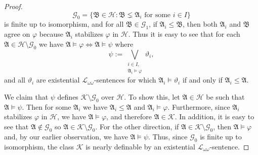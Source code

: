 \documentclass{ndjflart}
\theoremstyle{plain}
\theoremstyle{definition}
\numberwithin{equation}{section}
\begin{document}
\begin{proof}
\[
	\mathcal{G}_0 = \{\mathfrak{B}\in\mathcal{H} \colon
	\mathfrak{B} \lneq \mathfrak{A}_i \text{ for some } i \in I \}
\]
is finite up to isomorphism,
and for all $\mathfrak{B} \in \mathcal{G}_1$,
if $\mathfrak{A}_i\leq\mathfrak{B}$, then both $\mathfrak{A}_i$ and
$\mathfrak{B}$ agree on $\varphi$ because $\mathfrak{A}_i$ stabilizes
$\varphi$ in $\mathcal{H}$.
Thus it is easy to see that for each
$\mathfrak{A}\in\mathcal{H} \setminus \mathcal{G}_0$ we have
$\mathfrak{A} \vDash \varphi \Leftrightarrow \mathfrak{A} \vDash \psi$ where
\[
\psi := \bigvee_{\substack{i\in I,\\\mathfrak{A}_i\vDash\varphi}}\vartheta_i,
\]
and all $\vartheta_i$ are existential $\mathcal{L}_{\omega \omega}$-sentences
for which $\mathfrak{A}_i \vDash \vartheta_i$ if and only if
$\mathfrak{A}_i \leq \mathfrak{A}$.

We claim that $\psi$ defines $\mathcal{K} \setminus \mathcal{G}_0$ over
$\mathcal{H}$.
To show this, let $\mathfrak{A} \in \mathcal{H}$ be such that
$\mathfrak{A} \vDash \psi$.
Then for some $\mathfrak{A}_i$ we have $\mathfrak{A}_i \leq \mathfrak{A}$ and
$\mathfrak{A}_i \vDash \varphi$.
Furthermore, since $\mathfrak{A}_i$ stabilizes $\varphi$ in $\mathcal{H}$, we
have $\mathfrak{A} \vDash \varphi$, and therefore
$\mathfrak{A} \in \mathcal{K}$.
In addition, it is easy to see that $\mathfrak{A} \notin \mathcal{G}_0$ so
$\mathfrak{A} \in \mathcal{K} \setminus \mathcal{G}_0$.
For the other direction, if
$\mathfrak{A} \in \mathcal{K} \setminus \mathcal{G}_0$,
then $\mathfrak{A} \vDash \varphi$ and, by our earlier observation, we have
$\mathfrak{A} \vDash \psi$.
Thus, since $\mathcal{G}_0$ is finite up to isomorphism, the class $\mathcal{K}$ is nearly
definable by an existential $\mathcal{L}_{\omega\omega}$-sentence.
\end{proof}
\end{document}
